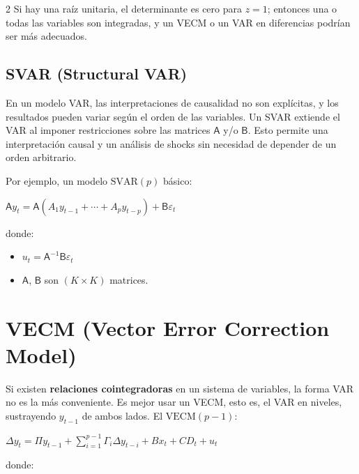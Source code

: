 \documentclass[10pt, a4paper, landscape]{article}
\begin{document}
\begin{multicols}{2}
Si hay una raíz unitaria, el determinante es cero para \( z = 1 \); entonces una o todas las variables son integradas, y un VECM o un VAR en diferencias podrían ser más adecuados.

\subsection*{SVAR (Structural VAR)}

En un modelo VAR, las interpretaciones de causalidad no son explícitas, y los resultados pueden variar según el orden de las variables. Un SVAR extiende el VAR al imponer restricciones sobre las matrices \( \mathsf{A} \) y/o \( \mathsf{B} \). Esto permite una interpretación causal y un análisis de shocks sin necesidad de depender de un orden arbitrario.

Por ejemplo, un modelo \( \text{SVAR}(p) \) básico:

\begin{center}
	\( \mathsf{A} y_t = \mathsf{A} (A_1 y_{t - 1} + \cdots + A_p y_{t - p}) + \mathsf{B} \varepsilon_t \)
\end{center}

donde:

\begin{itemize}[leftmargin=*]
	\item \( u_t = \mathsf{A}^{-1} \mathsf{B} \varepsilon_t \)
	\item \( \mathsf{A} \), \( \mathsf{B} \) son \( (K \times K) \) matrices.
\end{itemize}

\columnbreak

\section*{VECM (Vector Error Correction Model)}

Si existen \textbf{relaciones cointegradoras} en un sistema de variables, la forma VAR no es la más conveniente. Es mejor usar un VECM, esto es, el VAR en niveles, sustrayendo \( y_{t - 1} \) de ambos lados. El \( \text{VECM}(p - 1) \):

\begin{center}
	\( \Delta y_{t} = \Pi y_{t - 1} + \sum_{i = 1}^{p - 1} \Gamma_{i} \Delta y_{t - i} + B x_{t} + CD_{t} + u_{t} \)
\end{center}

donde:


\end{multicols}
\end{document}
